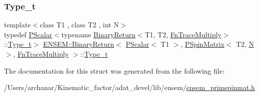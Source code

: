 \subsubsection{\texorpdfstring{Type\_t}{Type\_t}\hspace{0.1cm}{\footnotesize\ttfamily [2/2]}}
{\footnotesize\ttfamily template$<$class T1 , class T2 , int N$>$ \\
typedef \mbox{\hyperlink{classENSEM_1_1PScalar}{P\+Scalar}}$<$typename \mbox{\hyperlink{structENSEM_1_1BinaryReturn}{Binary\+Return}}$<$T1, T2, \mbox{\hyperlink{structENSEM_1_1FnTraceMultiply}{Fn\+Trace\+Multiply}}$>$\+::\mbox{\hyperlink{structENSEM_1_1BinaryReturn_3_01PScalar_3_01T1_01_4_00_01PSpinMatrix_3_01T2_00_01N_01_4_00_01FnTraceMultiply_01_4_a54f389cea9ca5225ec2ae23f92c50307}{Type\+\_\+t}}$>$ \mbox{\hyperlink{structENSEM_1_1BinaryReturn}{E\+N\+S\+E\+M\+::\+Binary\+Return}}$<$ \mbox{\hyperlink{classENSEM_1_1PScalar}{P\+Scalar}}$<$ T1 $>$, \mbox{\hyperlink{classENSEM_1_1PSpinMatrix}{P\+Spin\+Matrix}}$<$ T2, \mbox{\hyperlink{operator__name__util_8cc_a7722c8ecbb62d99aee7ce68b1752f337}{N}} $>$, \mbox{\hyperlink{structENSEM_1_1FnTraceMultiply}{Fn\+Trace\+Multiply}} $>$\+::\mbox{\hyperlink{structENSEM_1_1BinaryReturn_3_01PScalar_3_01T1_01_4_00_01PSpinMatrix_3_01T2_00_01N_01_4_00_01FnTraceMultiply_01_4_a54f389cea9ca5225ec2ae23f92c50307}{Type\+\_\+t}}}



The documentation for this struct was generated from the following file\+:\begin{DoxyCompactItemize}
\item 
/\+Users/archanar/\+Kinematic\+\_\+factor/adat\+\_\+devel/lib/ensem/\mbox{\hyperlink{lib_2ensem_2ensem__primspinmat_8h}{ensem\+\_\+primspinmat.\+h}}\end{DoxyCompactItemize}
